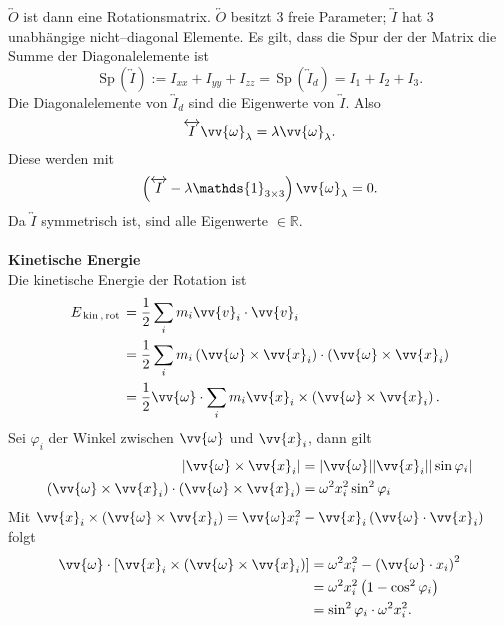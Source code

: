 \documentclass[a4paper,12pt]{article}
\numberwithin{equation}{section}
\begin{document}
$\overleftrightarrow{O}$ ist dann eine Rotationsmatrix. $\overleftrightarrow{O}$ besitzt 3 freie Parameter; $\overleftrightarrow{I}$ hat 3 unabhängige nicht--diagonal Elemente. Es gilt, dass die Spur der der Matrix die Summe der Diagonalelemente ist
\[ 
        \,\text{Sp}\,\left(\overleftrightarrow{I}\right):=I_{xx}+I_{yy}+I_{zz}=\,\text{Sp}\,\left(\overleftrightarrow{I}_d\right)=I_1+I_2+I_3
.\] 
Die Diagonalelemente von $\overleftrightarrow{I}_d$ sind die Eigenwerte von $\overleftrightarrow{I}$. Also
\[ 
        \overleftrightarrow{I}\vv{\omega }_\lambda =\lambda \vv{\omega }_\lambda 
.\] 
Diese werden mit
\[ 
        \left(\overleftrightarrow{I}-\lambda \mathds{1}_{3\times 3}\right)\vv{\omega }_\lambda =0
.\] 
Da $\overleftrightarrow{I}$ symmetrisch ist, sind alle Eigenwerte $ \in \mathbb{R}$.
\\\hfill\\\textbf{Kinetische Energie}\\ 
Die kinetische Energie der Rotation ist
\begin{align*}
        E_{\,\text{kin}\,,\,\text{rot}\,}&=\dfrac{1}{2}\sum_{i}^{}m_i\vv{v}_i\cdot \vv{v}_i\\
                                         &=\dfrac{1}{2}\sum_{i}^{}m_i\left(\vv{\omega }\times \vv{x}_i\right)\cdot \left(\vv{\omega }\times \vv{x}_i\right)\\
                                         &=\dfrac{1}{2}\vv{\omega }\cdot \sum_{i}^{}m_i\vv{x}_i\times \left(\vv{\omega }\times \vv{x}_i\right)
.\end{align*}
Sei $\varphi _i$ der Winkel zwischen $\vv{\omega }$ und $\vv{x}_i$, dann gilt 
\begin{align*}
        |\vv{\omega }\times \vv{x}_i|&=|\vv{\omega }| |\vv{x}_i| |\sin \varphi _i|\\
        \left(\vv{\omega }\times \vv{x}_i\right)\cdot \left(\vv{\omega }\times \vv{x}_i\right)&=\omega ^2x_i^2\sin ^2\varphi _i
\end{align*}
Mit $\vv{x}_i\times \left(\vv{\omega }\times \vv{x}_i\right)=\vv{\omega }x_i^2-\vv{x}_i\left(\vv{\omega }\cdot \vv{x}_i\right)$ folgt
\begin{align*}
        \vv{\omega }\cdot \left[\vv{x}_i\times \left(\vv{\omega }\times \vv{x}_i\right)\right]&=\omega ^2x_i^2-\left(\vv{\omega }\cdot x_i\right)^2\\
                                                                                              &=\omega ^2x_i^2\left(1-\cos ^2\varphi _i\right)\\
                                                                                              &=\sin ^2\varphi _i\cdot \omega ^2x_i^2
.\end{align*}
\end{document}
